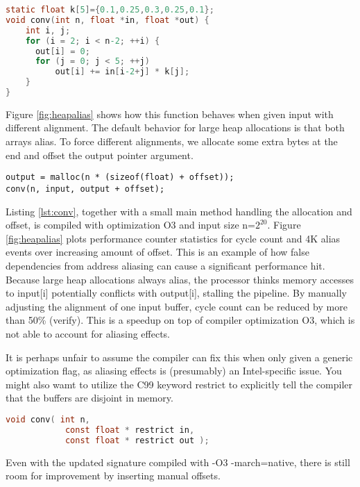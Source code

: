 \documentclass[a4paper,10pt,twocolumn,twoside]{article}
\begin{document}
\begin{lstlisting}[float=h, language=C, caption={Naive implementation of convolution. Highly sensitive to aliasing between input and output arrays.}, label={lst:conv}, frame=lines]
static float k[5]={0.1,0.25,0.3,0.25,0.1};
void conv(int n, float *in, float *out) {
    int i, j;
    for (i = 2; i < n-2; ++i) {
      out[i] = 0;
      for (j = 0; j < 5; ++j)
          out[i] += in[i-2+j] * k[j];
    }
}
\end{lstlisting}


Figure \ref{fig:heapalias} shows how this function behaves when given input with different alignment.
The default behavior for large heap allocations is that both arrays alias.
To force different alignments, we allocate some extra bytes at the end and offset the output pointer argument.

\begin{lstlisting}
output = malloc(n * (sizeof(float) + offset));
conv(n, input, output + offset);
\end{lstlisting}

Listing \ref{lst:conv}, together with a small main method handling the allocation and offset, is compiled with optimization O3 and input size n=$2^{20}$.
Figure \ref{fig:heapalias} plots performance counter statistics for cycle count and 4K alias events over increasing amount of offset.
This is an example of how false dependencies from address aliasing can cause a significant performance hit.
Because large heap allocations always alias, the processor thinks memory accesses to input[i] potentially conflicts with output[i], stalling the pipeline.
By manually adjusting the alignment of one input buffer, cycle count can be reduced by more than 50\% (verify).
This is a speedup on top of compiler optimization O3, which is not able to account for aliasing effects.

It is perhaps unfair to assume the compiler can fix this when only given a generic optimization flag, as aliasing effects is (presumably) an Intel-specific issue.
You might also wamt to utilize the C99 keyword restrict to explicitly tell the compiler that the buffers are disjoint in memory.

\begin{lstlisting}[language=C]
void conv( int n,
            const float * restrict in,
            const float * restrict out );
\end{lstlisting}

Even with the updated signature compiled with -O3 -march=native, there is still room for improvement by inserting manual offsets.
\end{document}
